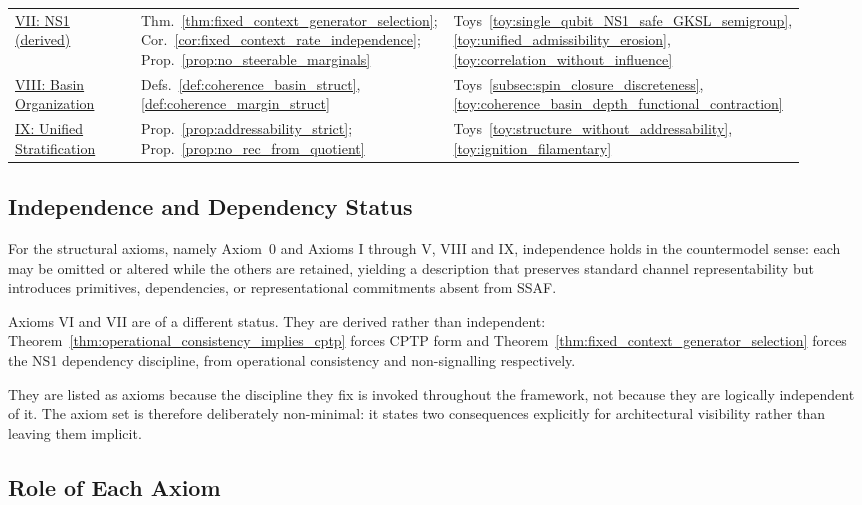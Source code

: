 \documentclass[aps,prx,onecolumn,11pt]{revtex4-2}
\theoremstyle{plain}
\theoremstyle{definition}
\theoremstyle{remark}
\begin{document}
\begin{table}[t]
\begin{tabular}{p{0.24\linewidth}p{0.40\linewidth}p{0.28\linewidth}}
\addlinespace
\hyperref[ax:NS1]{VII: NS1 (derived)} &
Thm.~\ref{thm:fixed_context_generator_selection};
Cor.~\ref{cor:fixed_context_rate_independence};
Prop.~\ref{prop:no_steerable_marginals} &
Toys~\ref{toy:single_qubit_NS1_safe_GKSL_semigroup},
\ref{toy:unified_admissibility_erosion},
\ref{toy:correlation_without_influence} \\
\addlinespace
\hyperref[ax:basin_representational_compression]{VIII: Basin
Organization} &
Defs.~\ref{def:coherence_basin_struct},
\ref{def:coherence_margin_struct} &
Toys~\ref{subsec:spin_closure_discreteness},
\ref{toy:coherence_basin_depth_functional_contraction} \\
\addlinespace
\hyperref[ax:unified_stratification]{IX: Unified Stratification} &
Prop.~\ref{prop:addressability_strict};
Prop.~\ref{prop:no_rec_from_quotient} &
Toys~\ref{toy:structure_without_addressability},
\ref{toy:ignition_filamentary} \\
\bottomrule
\end{tabular}
\end{table}

\subsection{Independence and Dependency Status}
\label{subsec:axiom_independence}

For the structural axioms, namely Axiom~0 and Axioms I through V, VIII
and IX, independence holds in the countermodel sense: each may be
omitted or altered while the others are retained, yielding a description
that preserves standard channel representability but introduces
primitives, dependencies, or representational commitments absent from
SSAF.

Axioms VI and VII are of a different status. They are derived rather
than independent:
Theorem~\ref{thm:operational_consistency_implies_cptp} forces CPTP form
and Theorem~\ref{thm:fixed_context_generator_selection} forces the NS1
dependency discipline, from operational consistency and non-signalling
respectively.

They are listed as axioms because the discipline they fix is invoked
throughout the framework, not because they are logically independent of
it. The axiom set is therefore deliberately non-minimal: it states two
consequences explicitly for architectural visibility rather than leaving
them implicit.

\subsection{Role of Each Axiom}
\label{subsec:axiom_necessity}
\end{document}
